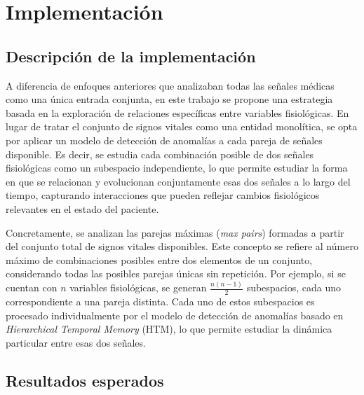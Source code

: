 \chapter{Implementación}

\section{Descripción de la implementación}

A diferencia de enfoques anteriores que analizaban todas las señales médicas como una única entrada conjunta, en este trabajo se propone una estrategia basada en la exploración de relaciones específicas entre variables fisiológicas. En lugar de tratar el conjunto de signos vitales como una entidad monolítica, se opta por aplicar un modelo de detección de anomalías a cada pareja de señales disponible. Es decir, se estudia cada combinación posible de dos señales fisiológicas como un subespacio independiente, lo que permite estudiar la forma en que se relacionan y evolucionan conjuntamente esas dos señales a lo largo del tiempo, capturando interacciones que pueden reflejar cambios fisiológicos relevantes en el estado del paciente.

Concretamente, se analizan las parejas máximas (\textit{max pairs}) formadas a partir del conjunto total de signos vitales disponibles. Este concepto se refiere al número máximo de combinaciones posibles entre dos elementos de un conjunto, considerando todas las posibles parejas únicas sin repetición. Por ejemplo, si se cuentan con $n$ variables fisiológicas, se generan $\frac{n(n-1)}{2}$ subespacios, cada uno correspondiente a una pareja distinta. Cada uno de estos subespacios es procesado individualmente por el modelo de detección de anomalías basado en \textit{Hierarchical Temporal Memory }(HTM), lo que permite estudiar la dinámica particular entre esas dos señales.


\medskip

\section{Resultados esperados}